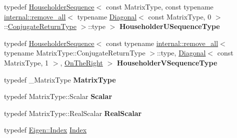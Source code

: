 \begin{DoxyCompactItemize}
typedef \hyperlink{group___householder___module_class_eigen_1_1_householder_sequence}{Householder\+Sequence}$<$ const Matrix\+Type, const typename \hyperlink{struct_eigen_1_1internal_1_1remove__all}{internal\+::remove\+\_\+all}$<$ typename \hyperlink{group___core___module_class_eigen_1_1_diagonal}{Diagonal}$<$ const Matrix\+Type, 0 $>$\+::\hyperlink{class_eigen_1_1internal_1_1_tensor_lazy_evaluator_writable}{Conjugate\+Return\+Type} $>$\+::type $>$ {\bfseries Householder\+U\+Sequence\+Type}
\item 
\mbox{\label{class_eigen_1_1internal_1_1_upper_bidiagonalization_aa93645d9dfab0b02287e8b66b4018007}} 
typedef \hyperlink{group___householder___module_class_eigen_1_1_householder_sequence}{Householder\+Sequence}$<$ const typename \hyperlink{struct_eigen_1_1internal_1_1remove__all}{internal\+::remove\+\_\+all}$<$ typename Matrix\+Type\+::\+Conjugate\+Return\+Type $>$\+::type, \hyperlink{group___core___module_class_eigen_1_1_diagonal}{Diagonal}$<$ const Matrix\+Type, 1 $>$, \hyperlink{group__enums_ggac22de43beeac7a78b384f99bed5cee0ba99dc75d8e00b6c3a5bdc31940f47492b}{On\+The\+Right} $>$ {\bfseries Householder\+V\+Sequence\+Type}
\item 
\mbox{\label{class_eigen_1_1internal_1_1_upper_bidiagonalization_a9f1c62710b34e7076b8f118f90121a80}} 
typedef \+\_\+\+Matrix\+Type {\bfseries Matrix\+Type}
\item 
\mbox{\label{class_eigen_1_1internal_1_1_upper_bidiagonalization_aea9ea6ba33f6f6e24d70beab63d88cba}} 
typedef Matrix\+Type\+::\+Scalar {\bfseries Scalar}
\item 
\mbox{\label{class_eigen_1_1internal_1_1_upper_bidiagonalization_a7ecad0d6eda591982bdb84fd96553fec}} 
typedef Matrix\+Type\+::\+Real\+Scalar {\bfseries Real\+Scalar}
\item 
typedef \hyperlink{namespace_eigen_a62e77e0933482dafde8fe197d9a2cfde}{Eigen\+::\+Index} \hyperlink{class_eigen_1_1internal_1_1_upper_bidiagonalization_adcb14f3919a3dcc9977ba6b8105087fe}{Index}
\item 
\mbox{\label{class_eigen_1_1internal_1_1_upper_bidiagonalization_a43c537195ce8336a04e30246baf6860e}} 

\end{DoxyCompactItemize}
